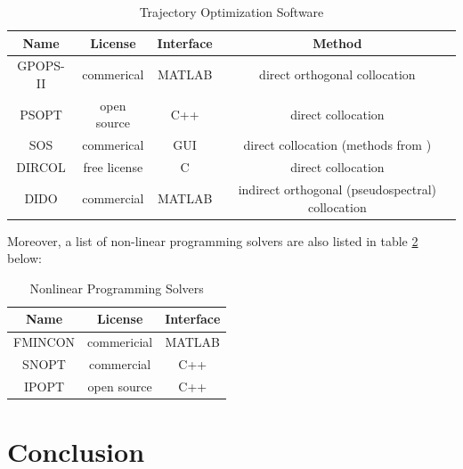 \documentclass{thesisreport}
\begin{document}
\begin{table}[h]
\caption{Trajectory Optimization Software}\label{Trajectory_Optimization_software}
\centering
\setlength{\tabcolsep}{10pt} %
\renewcommand{\arraystretch}{1} %
\begin{tabular}{||c | c |c |c||}
\hline
Name & License & Interface & Method \\
\hline
\hline
GPOPS-II \cite{Patterson2013} & commerical & MATLAB & direct orthogonal collocation \\
\hline
PSOPT \cite{Becerra2011}& open source & C++ & direct collocation \\
\hline
SOS \cite{Astos2013} & commerical & GUI & direct collocation (methods from \cite{Betts2010}) \\
\hline
DIRCOL \cite{vonStryk1999} & free license & C & direct collocation \\
\hline
DIDO \cite{Elissar2021} & commercial & MATLAB & indirect orthogonal (pseudospectral) collocation\\
\hline
\hline
\end{tabular}
\end{table}

Moreover, a list of non-linear programming solvers are also listed in table \ref{Nonlinear_Programming_Software} below:

\begin{table}[h]
\caption{Nonlinear Programming Solvers}\label{Nonlinear_Programming_Software}
\centering
\setlength{\tabcolsep}{10pt} %
\renewcommand{\arraystretch}{1} %
\begin{tabular}{||c |c |c||}
\hline
Name & License & Interface  \\
\hline
\hline
FMINCON \cite{Mathworks2021} & commericial & MATLAB \\
\hline
SNOPT \cite{Gill2006} & commercial & C++ \\
\hline
IPOPT \cite{Wachter2006} & open source & C++  \\
\hline
\hline
\end{tabular}
\end{table}






\newpage 
 
 
 
 
 
 
 
 \chapter*{Conclusion}
 
\end{document}
